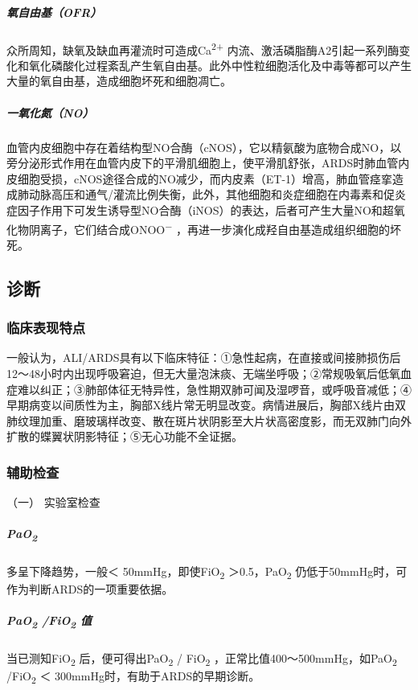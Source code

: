 \subparagraph{氧自由基（OFR）}

众所周知，缺氧及缺血再灌流时可造成Ca\textsuperscript{2+}
内流、激活磷脂酶A2引起一系列酶变化和氧化磷酸化过程紊乱产生氧自由基。此外中性粒细胞活化及中毒等都可以产生大量的氧自由基，造成细胞坏死和细胞凋亡。

\subparagraph{一氧化氮（NO）}

血管内皮细胞中存在着结构型NO合酶（cNOS），它以精氨酸为底物合成NO，以旁分泌形式作用在血管内皮下的平滑肌细胞上，使平滑肌舒张，ARDS时肺血管内皮细胞受损，cNOS途径合成的NO减少，而内皮素（ET-1）增高，肺血管痉挛造成肺动脉高压和通气/灌流比例失衡，此外，其他细胞和炎症细胞在内毒素和促炎症因子作用下可发生诱导型NO合酶（iNOS）的表达，后者可产生大量NO和超氧化物阴离子，它们结合成ONOO\textsuperscript{−}
，再进一步演化成羟自由基造成组织细胞的坏死。

\subsection{诊断}

\subsubsection{临床表现特点}

一般认为，ALI/ARDS具有以下临床特征：①急性起病，在直接或间接肺损伤后12～48小时内出现呼吸窘迫，但无大量泡沫痰、无端坐呼吸；②常规吸氧后低氧血症难以纠正；③肺部体征无特异性，急性期双肺可闻及湿啰音，或呼吸音减低；④早期病变以间质性为主，胸部X线片常无明显改变。病情进展后，胸部X线片由双肺纹理加重、磨玻璃样改变、散在斑片状阴影至大片状高密度影，而无双肺门向外扩散的蝶翼状阴影特征；⑤无心功能不全证据。

\subsubsection{辅助检查}

\hypertarget{text00078.htmlux5cux23CHP3-5-2-2-1}{}
（一） 实验室检查

\subparagraph{PaO\textsubscript{2}}

多呈下降趋势，一般＜ 50mmHg，即使FiO\textsubscript{2}
＞0.5，PaO\textsubscript{2}
仍低于50mmHg时，可作为判断ARDS的一项重要依据。

\subparagraph{PaO\textsubscript{2} /FiO\textsubscript{2} 值}

当已测知FiO\textsubscript{2} 后，便可得出PaO\textsubscript{2} /
FiO\textsubscript{2} ，正常比值400～500mmHg，如PaO\textsubscript{2}
/FiO\textsubscript{2} ＜ 300mmHg时，有助于ARDS的早期诊断。

